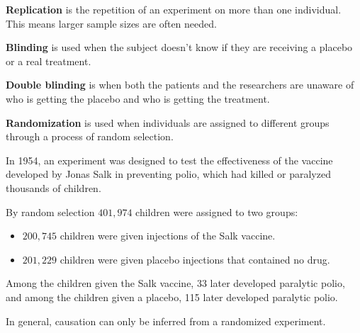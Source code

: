 \documentclass{beamer}
\begin{document}
\begin{frame}
\begin{definition}
\textbf{Replication} is the repetition of an experiment on more than one individual. This means larger sample sizes are often needed.
\end{definition}\pause

\begin{definition}
\textbf{Blinding} is used when the subject doesn't know if they are receiving a placebo or a real treatment.
\end{definition}\pause

\begin{definition} 
\textbf{Double blinding} is when both the patients and the researchers are unaware of who is getting the placebo and who is getting the treatment.
\end{definition}\pause

\begin{definition}
\textbf{Randomization} is used when individuals are assigned to different groups through a process of random selection.
\end{definition}
\end{frame}

\begin{frame}
\begin{example}
In 1954, an experiment was designed to test the effectiveness of the vaccine developed by Jonas Salk in preventing polio, which had killed or paralyzed thousands of children.\pause

\vspace{2mm}
By random selection $401,974$ children were assigned to two groups:
\begin{itemize}
\item $200,745$ children were given injections of the Salk vaccine.
\item $201,229$ children were given placebo injections that contained no drug.
\end{itemize}\pause

\vspace{2mm}
Among the children given the Salk vaccine, 33 later developed paralytic polio, and among the children given a placebo, 115 later developed paralytic polio.
\end{example}\pause

\begin{note}
In general, causation can only be inferred from a randomized experiment.
\end{note}
\end{frame}
\end{document}
